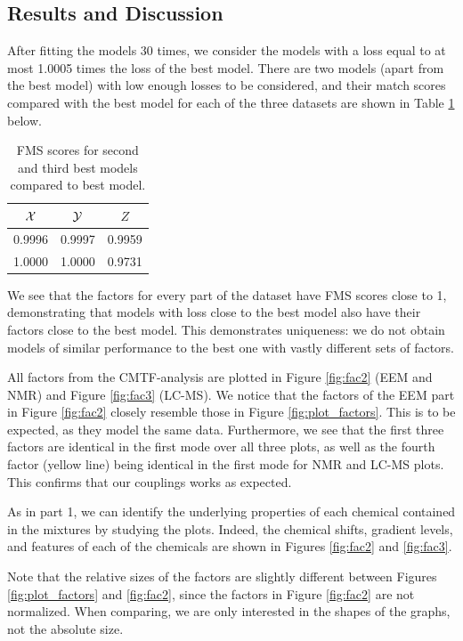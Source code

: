 \subsection*{Results and Discussion}

After fitting the models 30 times, we consider the models with a loss equal to at most 1.0005 times the loss of the best model.
There are two models (apart from the best model) with low enough losses to be considered, and their match scores compared with the best model for each of the three datasets are shown in Table \ref{tab:score} below.

\begin{table}[H]
    \centering
    \begin{tabular}{|c|c|c|}
         \hline
         $\mathcal{X}$ & $\mathcal{Y}$ & $Z$ \\
         \hline
         0.9996 & 0.9997 & 0.9959 \\
         \hline
         1.0000 & 1.0000 & 0.9731 \\
         \hline
    \end{tabular}
    \caption{FMS scores for second and third best models compared to best model.}
    \label{tab:score}
\end{table}

We see that the factors for every part of the dataset have FMS scores close to 1, demonstrating that models with loss close to the best model also have their factors close to the best model.
This demonstrates uniqueness: we do not obtain models of similar performance to the best one with vastly different sets of factors.

All factors from the CMTF-analysis are plotted in Figure \ref{fig:fac2} (EEM and NMR) and Figure \ref{fig:fac3} (LC-MS).
We notice that the factors of the EEM part in Figure \ref{fig:fac2} closely resemble those in Figure \ref{fig:plot_factors}.
This is to be expected, as they model the same data.
Furthermore, we see that the first three factors are identical in the first mode over all three plots, as well as the fourth factor (yellow line) being identical in the first mode for NMR and LC-MS plots.
This confirms that our couplings works as expected.

As in part 1, we can identify the underlying properties of each chemical contained in the mixtures by studying the plots.
Indeed, the chemical shifts, gradient levels, and features of each of the chemicals are shown in Figures \ref{fig:fac2} and \ref{fig:fac3}.

Note that the relative sizes of the factors are slightly different between Figures \ref{fig:plot_factors} and \ref{fig:fac2}, since the factors in Figure \ref{fig:fac2} are not normalized.
When comparing, we are only interested in the shapes of the graphs, not the absolute size.

